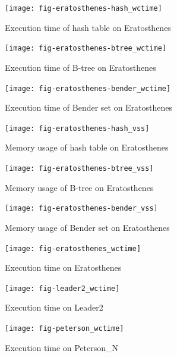 \documentclass{acm_proc_article-sp}
\begin{document}

\begin{figure}[p]
\centering
\texttt{[image: fig-eratosthenes-hash\_wctime]}
\caption{Execution time of hash table on Eratosthenes}
\label{fig-eratosthenes-hash_wctime}
\end{figure}

\begin{figure}[p]
\centering
\texttt{[image: fig-eratosthenes-btree\_wctime]}
\caption{Execution time of B-tree on Eratosthenes}
\label{fig-eratosthenes-btree_wctime}
\end{figure}

\begin{figure}[p]
\centering
\texttt{[image: fig-eratosthenes-bender\_wctime]}
\caption{Execution time of Bender set on Eratosthenes}
\label{fig-eratosthenes-bender_wctime}
\end{figure}

\begin{figure}[p]
\centering
\texttt{[image: fig-eratosthenes-hash\_vss]}
\caption{Memory usage of hash table on Eratosthenes}
\label{fig-eratosthenes-hash_vss}
\end{figure}

\begin{figure}[p]
\centering
\texttt{[image: fig-eratosthenes-btree\_vss]}
\caption{Memory usage of B-tree on Eratosthenes}
\label{fig-eratosthenes-btree_vss}
\end{figure}

\begin{figure}[p]
\centering
\texttt{[image: fig-eratosthenes-bender\_vss]}
\caption{Memory usage of Bender set on Eratosthenes}
\label{fig-eratosthenes-bender_vss}
\end{figure}

\begin{figure}[p]
\centering
\texttt{[image: fig-eratosthenes\_wctime]}
\caption{Execution time on Eratosthenes}
\label{fig-eratosthenes_wctime}
\end{figure}

\begin{figure}[p]
\centering
\texttt{[image: fig-leader2\_wctime]}
\caption{Execution time on Leader2}
\label{fig-leader2_wctime}
\end{figure}

\begin{figure}[p]
\centering
\texttt{[image: fig-peterson\_wctime]}
\caption{Execution time on Peterson\_N}
\label{fig-peterson_wctime}
\end{figure}
\end{document}
